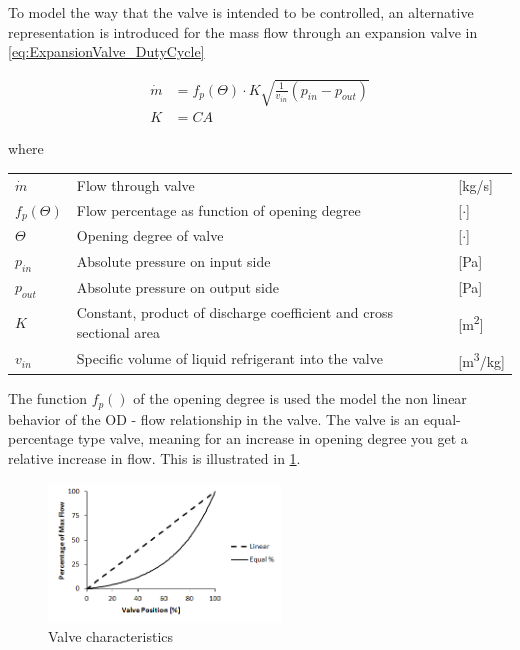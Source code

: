 To model the way that the valve is intended to be controlled, an alternative representation is introduced for the mass flow through an expansion valve in \cref{eq:ExpansionValve_DutyCycle}


\begin{equation} \label{eq:ExpansionValve_DutyCycle}
	\begin{split}
		\dot{m} &= f_p(\Theta) \cdot K  \sqrt{\frac{1}{v_{in}} (p_{in} - p_{out})}\\
		K 			&= C A
	\end{split}
\end{equation}

where
\begin{center}
	\begin{tabular}{l p{8cm} l}
		$\dot{m}$	& Flow through valve & [\si{kg}/\si{s}]\\
		$f_p(\Theta)$ & Flow percentage as function of opening degree & [$\cdot$] \\
		$ \Theta $ & Opening degree of valve& [$ \cdot $]\\
		$p_{in}$ 	& Absolute pressure on input side & [\si{Pa}]\\
		$p_{out}$ 	& Absolute pressure on output side & [\si{Pa}]\\
		$K$ 		& Constant, product of discharge coefficient and cross sectional area & [\si{m^2}]\\
		$v_{in}$ 	& Specific volume of liquid refrigerant into the valve & [\si{m^3}/\si{kg}]

	\end{tabular}
\end{center}

The function $f_p()$ of the opening degree is used the model the non linear behavior of the OD - flow relationship in the valve. The valve is an equal-percentage type valve, meaning for an increase in opening degree you get a relative increase in flow. This is illustrated in \cref{fig:equal_percent_valve}.

\begin{figure}[h!]
	\centering
	\includegraphics[width=0.55\textwidth]{Graphics/Equal-percentage.png}
	\caption{Valve characteristics}
	\label{fig:equal_percent_valve}
\end{figure}


